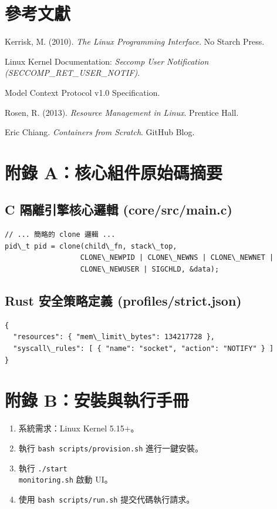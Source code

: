 \documentclass[12pt, a4paper, twoside]{article}
\begin{document}
\newpage
\section{參考文獻}
\begin{enumerate}[label={[\arabic*]}]
    \item Kerrisk, M. (2010). \textit{The Linux Programming Interface}. No Starch Press.
    \item Linux Kernel Documentation: \textit{Seccomp User Notification (SECCOMP\_RET\_USER\_NOTIF\allowbreak)}.
    \item Model Context Protocol v1.0 Specification.
    \item Rosen, R. (2013). \textit{Resource Management in Linux}. Prentice Hall.
    \item Eric Chiang. \textit{Containers from Scratch}. GitHub Blog.
\end{enumerate}

\newpage

\appendix
\section{附錄 A：核心組件原始碼摘要}
\subsection{C 隔離引擎核心邏輯 (core/src/main.c)}
\begin{verbatim}
// ... 簡略的 clone 邏輯 ...
pid\_t pid = clone(child\_fn, stack\_top, 
                  CLONE\_NEWPID | CLONE\_NEWNS | CLONE\_NEWNET | 
                  CLONE\_NEWUSER | SIGCHLD, &data);
\end{verbatim}

\subsection{Rust 安全策略定義 (profiles/strict.json)}
\begin{verbatim}
{
  "resources": { "mem\_limit\_bytes": 134217728 },
  "syscall\_rules": [ { "name": "socket", "action": "NOTIFY" } ]
}
\end{verbatim}

\section{附錄 B：安裝與執行手冊}
\begin{enumerate}
    \item 系統需求：Linux Kernel 5.15+。
    \item 執行 \texttt{bash scripts/provision.sh} 進行一鍵安裝。
    \item 執行 \texttt{./start\\\-monitoring.sh} 啟動 UI。
    \item 使用 \texttt{bash scripts/run.sh} 提交代碼執行請求。
\end{enumerate}
\end{document}
